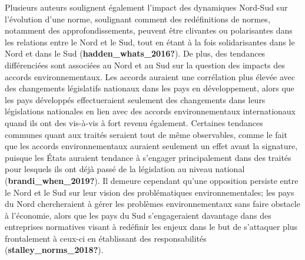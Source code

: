 \documentclass[12pt]{ulaval}
\begin{document}
Plusieurs auteurs soulignent également l'impact des dynamiques Nord-Sud sur l'évolution d'une norme, soulignant comment des redéfinitions de normes, notamment des approfondissements, peuvent être clivantes ou polarisantes dans les relations entre le Nord et le Sud, tout en étant à la fois solidarisantes dans le Nord et dans le Sud (\textbf{hadden\_whats\_2016?}). De plus, des tendances différenciées sont associées au Nord et au Sud sur la question des impacts des accords environnementaux. Les accords auraient une corrélation plus élevée avec des changements législatifs nationaux dans les pays en développement, alors que les pays développés effectueraient seulement des changements dans leurs législations nationales en lien avec des accords environnementaux internationaux quand ils ont des vis-à-vis à fort revenu également. Certaines tendances communes quant aux traités seraient tout de même observables, comme le fait que les accords environnementaux auraient seulement un effet avant la signature, puisque les États auraient tendance à s'engager principalement dans des traités pour lesquels ils ont déjà passé de la législation au niveau national (\textbf{brandi\_when\_2019?}). Il demeure cependant qu'une opposition persiste entre le Nord et le Sud sur leur vision des problématiques environnementales; les pays du Nord chercheraient à gérer les problèmes environnementaux sans faire obstacle à l'économie, alors que les pays du Sud s'engageraient davantage dans des entreprises normatives visant à redéfinir les enjeux dans le but de s'attaquer plus frontalement à ceux-ci en établissant des responsabilités (\textbf{stalley\_norms\_2018?}).
\end{document}
